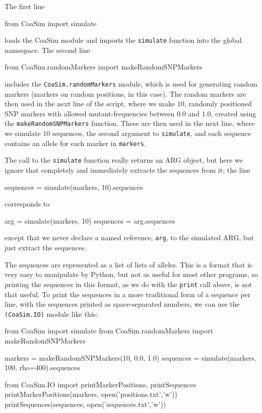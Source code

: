 \documentclass{manual}
\begin{document}
\begin{empfile}
\noindent
The first line
\begin{code}
from CoaSim import simulate
\end{code}
loads the CoaSim module and imports the \texttt{simulate} function
into the global namespace.  The second line 
\begin{code}
from CoaSim.randomMarkers import makeRandomSNPMarkers
\end{code}
includes the \texttt{CoaSim.randomMarkers} module, which is used for
generating random markers (markers on random positions, in this case).
The random markers are then used in the next line of the script, where
we make $10$, randomly positioned SNP markers with allowed
mutant-frequencies between $0.0$ and $1.0$, created using the
\texttt{makeRandomSNPMarkers} function.  These are then used in the
next line, where we simulate $10$  sequences, the second argument to
\texttt{simulate}, and each sequence contains an allele for
each marker in \texttt{markers}.

The call to the \texttt{simulate} function really returns an ARG
object, but here we ignore that completely and immediately extracts
the sequences from it; the line
\begin{code}
sequences = simulate(markers, 10).sequences
\end{code}
corresponds to
\begin{code}
arg = simulate(markers, 10)
sequences = arg.sequences
\end{code}
except that we never declare a named reference, \texttt{arg}, to the
simulated ARG, but just extract the sequences.

The sequences are represented as a list of lists of alleles.  This is
a format that is very easy to manipulate by Python, but not as useful
for most other programs, so printing the sequences in this format, as
we do with the \texttt{print} call above, is not that useful.  To
print the sequences in a more traditional form of a sequence per line,
with the sequences printed as space-separated numbers, we can use the
\texttt{(CoaSim.IO)} module like this:
\begin{code}
from CoaSim import simulate
from CoaSim.randomMarkers import makeRandomSNPMarkers

markers = makeRandomSNPMarkers(10, 0.0, 1.0)
sequences = simulate(markers, 100, rho=400).sequences

from CoaSim.IO import printMarkerPositions, printSequences
printMarkerPositions(markers, open('positions.txt','w'))
printSequences(sequences, open('sequences.txt','w'))
\end{code}


\end{empfile}
\end{document}

